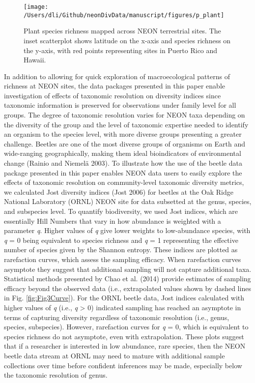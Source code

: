 \documentclass[
  12pt,
]{article}
\begin{document}
\begin{figure}

{\centering \texttt{[image: /Users/dli/Github/neonDivData/manuscript/figures/p\_plant]} 

}

\caption{Plant species richness mapped across NEON terrestrial sites. The inset scatterplot shows latitude on the x-axis and species richness on the y-axis, with red points representing sites in Puerto Rico and Hawaii.}\label{fig:Fig2Map}
\end{figure}

In addition to allowing for quick exploration of macroecological patterns of richness at NEON sites, the data packages presented in this paper enable investigation of effects of taxonomic resolution on diversity indices since taxonomic information is preserved for observations under family level for all groups. The degree of taxonomic resolution varies for NEON taxa depending on the diversity of the group and the level of taxonomic expertise needed to identify an organism to the species level, with more diverse groups presenting a greater challenge. Beetles are one of the most diverse groups of organisms on Earth and wide-ranging geographically, making them ideal bioindicators of environmental change (Rainio and Niemelä 2003). To illustrate how the use of the beetle data package presented in this paper enables NEON data users to easily explore the effects of taxonomic resolution on community-level taxonomic diversity metrics, we calculated Jost diversity indices (Jost 2006) for beetles at the Oak Ridge National Laboratory (ORNL) NEON site for data subsetted at the genus, species, and subspecies level. To quantify biodiversity, we used Jost indices, which are essentially Hill Numbers that vary in how abundance is weighted with a parameter \emph{q}. Higher values of \emph{q} give lower weights to low-abundance species, with \emph{q} = 0 being equivalent to species richness and \emph{q} = 1 representing the effective number of species given by the Shannon entropy. These indices are plotted as rarefaction curves, which assess the sampling efficacy. When rarefaction curves asymptote they suggest that additional sampling will not capture additional taxa. Statistical methods presented by Chao et al. (2014) provide estimates of sampling efficacy beyond the observed data (i.e., extrapolated values shown by dashed lines in Fig. \ref{fig:Fig3Curve}). For the ORNL beetle data, Jost indices calculated with higher values of \emph{q} (i.e., \emph{q} \textgreater{} 0) indicated sampling has reached an asymptote in terms of capturing diversity regardless of taxonomic resolution (i.e., genus, species, subspecies). However, rarefaction curves for \emph{q} = 0, which is equivalent to species richness do not asymptote, even with extrapolation. These plots suggest that if a researcher is interested in low abundance, rare species, then the NEON beetle data stream at ORNL may need to mature with additional sample collections over time before confident inferences may be made, especially below the taxonomic resolution of genus.
\end{document}
